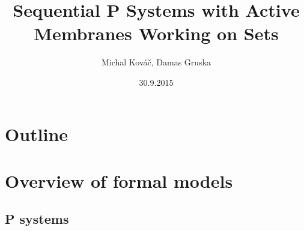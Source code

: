 \usepackage[utf8]{inputenc}
\usepackage{slovak}
\usepackage{tikz}
\usepackage{fancybox}
\usepackage{import}
\usepackage{forloop}
\usepackage{color,soul}
\usepackage{ifthen}
\makeatletter
\newcommand\SoulColor{%
  \let\set@color\beamerorig@set@color
  \let\reset@color\beamerorig@reset@color}
\newcommand\hlif[2]{%
  \ifthenelse{#1}{\SoulColor\hl{#2}}{#2}
}
\makeatother
\usepackage[english]{babel}
\usetikzlibrary{arrows,positioning}

\title{Sequential P Systems with Active Membranes Working on Sets}
\author{Michal Kováč, Damas Gruska}
\date{30.9.2015}


\begin{frame}[t]
\titlepage
\end{frame}
\note{}

\section*{Outline}
\begin{frame}
\tableofcontents
\end{frame}
\note{}

\section{Overview of formal models} %
\label{sec:overview_of_formal_models}

  \subsection{P systems} %
  \label{sub:p_systems}

